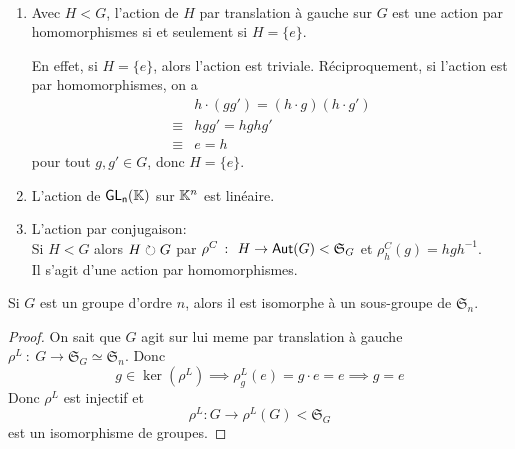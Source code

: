 \begin{example}\,
    \begin{enumerate}
        \item Avec \(H < G\), l'action de \(H\) par translation à gauche sur \(G\) est
        une action par homomorphismes si et seulement si \(H = \{e\}\).

        En effet, si \(H = \{e\}\), alors l'action est triviale. Réciproquement, si
        l'action est par homomorphismes, on a
        \begin{equation*}
            \begin{aligned}
                & h \cdot (gg') = (h \cdot g)(h \cdot g')\\
                \equiv & hgg' = hghg'\\
                \equiv & e = h
            \end{aligned}
        \end{equation*}
        pour tout \(g,g'\in G\), donc \(H = \{e\}\).

        \item L'action de \(\operatorname{\mathsf{GL_{n}}}(\mathbb{K})\) sur \(\mathbb{K}^n\) est linéaire.

        \item L'action par conjugaison:\\
        Si \(H < G\) alors \(H\circlearrowright G\) par \(\rho^C\ \colon\ H\to\operatorname{\mathsf{Aut}}(G) < {\mathfrak{S}}_G\)
        et \(\rho^C_h(g) = hgh^{-1}\).\\
        Il s'agit d'une action par homomorphismes.
    \end{enumerate}
\end{example}

\begin{theorem}[Cayley]
    Si \(G\) est un groupe d'ordre \(n\), alors il est isomorphe à un sous-groupe
    de \({\mathfrak{S}}_n\).
\end{theorem}

\begin{proof}
    On sait que \(G\) agit sur lui meme par translation à gauche
    \(\rho^L\ \colon\ G\to{\mathfrak{S}}_G \simeq {\mathfrak{S}}_n\). 
    Donc
    \begin{equation*}
        g\in \ker(\rho^L) \implies \rho^L_g(e) = g\cdot e = e \implies g = e
    \end{equation*}
    Donc \(\rho^L\) est injectif et
    \begin{equation*}
        \rho^L : G \to \rho^L(G) < {\mathfrak{S}}_G
    \end{equation*}
    est un isomorphisme de groupes.
\end{proof}

